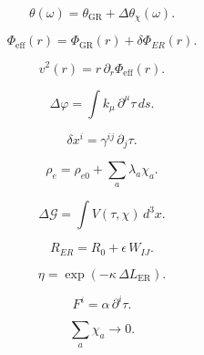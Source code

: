 \[
\theta(\omega)=\theta_{\mathrm{GR}}+\Delta\theta_{\chi}(\omega).
\]

\[
\Phi_{\mathrm{eff}}(r)=\Phi_{\mathrm{GR}}(r)+\delta\Phi_{ER}(r).
\]

\[
v^2(r)=r\,\partial_r\Phi_{\mathrm{eff}}(r).
\]

\[
\Delta\varphi=\int k_\mu\,\partial^\mu\tau\,ds.
\]

\[
\delta x^i = \gamma^{ij}\,\partial_j \tau.
\]

\[
\rho_e = \rho_{e0} + \sum_a \lambda_a \chi_a.
\]

\[
\Delta \mathcal{G} = \int V(\tau,\chi)\, d^3x.
\]

\[
R_{ER} = R_0 + \epsilon\, W_{IJ}.
\]

\[
\eta = \exp(-\kappa\, \Delta L_{\mathrm{ER}}).
\]

\[
F^i = \alpha\, \partial^i \tau.
\]

\[
\sum_a \chi_a \to 0.
\]

